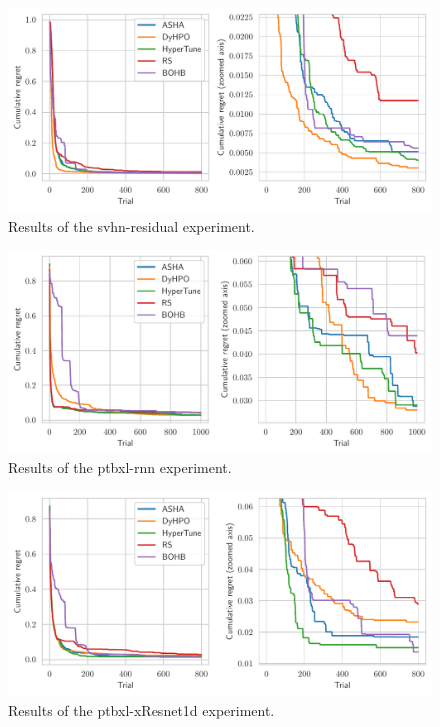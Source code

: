 \begin{figure}[H]
    \centering
    \includegraphics[scale=0.65]{img/real_exp/svhn_residual_regret_plot.pdf}
    \caption{Results of the svhn-residual experiment.}
    \label{fig:svhn_residual}
\end{figure}


\begin{figure}[H]
    \centering
    \includegraphics[scale=0.65]{img/real_exp/ptbxl_rnn_regret_plot.pdf}
    \caption{Results of the ptbxl-rnn experiment.}
    \label{fig:ptbxl_rnn}
\end{figure}

\begin{figure}[H]
    \centering
    \includegraphics[scale=0.65]{img/real_exp/ptbxl_xResNet1d_regret_plot.pdf}
    \caption{Results of the ptbxl-xResnet1d experiment.}
    \label{fig:ptbxl_xresnet}
\end{figure}

